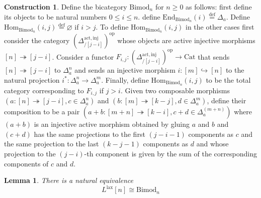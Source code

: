 \documentclass[a4paper, reqno]{amsart}
\newtheorem{lemma}[theorem]{Lemma}
\theoremstyle{definition}
\newtheorem{construction}[theorem]{Construction}
\newcommand\mor{\mathrm{Hom}}
\newcommand\inj{\mathrm{inj}}
\newcommand\op{\mathrm{op}}
\newcommand\cat{\mathrm{Cat}}
\newcommand\bydef{\overset{\mathrm{def}}{=}}
\newcommand\lax{\mathrm{lax}}
\newcommand\bimod{\mathrm{Bimod}}
\newcommand\act{\mathrm{act}}
\begin{document}
\begin{construction}\label{constr:lax_mon}
Define the bicategory $\bimod_n$ for $n\geq0$ as follows: first define its objects to be natural numbers $0\leq i\leq n$. define $\mathrm{End}_{\bimod_n}(i)\bydef \Delta_a$. Define $\mor_{\bimod_n}(i,j)\bydef \varnothing$ if $i>j$. To define $\mor_{\bimod_n}(i,j)$ in the other cases first consider the category $(\Delta^{\act,\inj}_{/[j-i]})^\op$ whose objects are active injective morphisms $[n]\twoheadrightarrow [j-i]$. Consider a functor $F_{i,j}:(\Delta^{\act,\inj}_{/[j-i]})^\op\rightarrow\cat$ that sends $[n]\twoheadrightarrow [j-i]$ to $\Delta^n_a$ and sends an injective morphism $i:[m]\hookrightarrow[n]$ to the natural projection $i^*:\Delta^n_a\rightarrow\Delta^m_a$. Finally, define $\mor_{\bimod_n}(i,j)$ to be the total category corresponding to $F_{i,j}$ if $j>i$. Given two composable morphisms $(a:[n]\twoheadrightarrow[j-i],c\in\Delta^n_a)$ and $(b:[m]\twoheadrightarrow[k-j],d\in\Delta^m_a)$, define their composition to be a pair $(a+b:[m+n]\twoheadrightarrow[k-i],c+d\in\Delta^{(m+n)}_a)$ where $(a+b)$ is an injective active morphism obtained by gluing $a$ and $b$ and $(c+d)$ has the same projections to the first $(j-i-1)$ components as $c$ and the same projection to the last $(k-j-1)$ components as $d$ and whose projection to the $(j-i)$-th component is given by the sum of the corresponding components of $c$ and $d$.
\end{construction}
\begin{lemma}\label{lem:bimod}
There is a natural equivalence 
\[L^\lax [n]\cong \bimod_n\]
\end{lemma}
\end{document}
